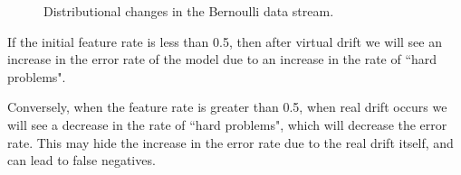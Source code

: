 \begin{figure}
    \centering
    \caption{Distributional changes in the Bernoulli data stream.}
    \label{fig:bernoulli_hard}
\end{figure}

If the initial feature rate is less than 0.5, then after virtual drift we will see an increase in the error rate of the model due to an increase in the rate of ``hard problems". 

Conversely, when the feature rate is greater than 0.5, when real drift occurs we will see a decrease in the rate of ``hard problems", which will decrease the error rate. This may hide the increase in the error rate due to the real drift itself, and can lead to false negatives. 

